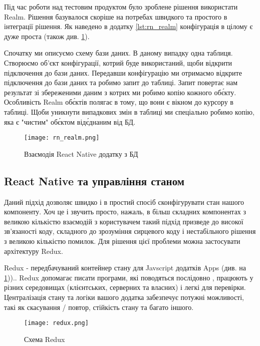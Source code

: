 Під час роботи над тестовим продуктом було зроблене рішення використати Realm.
Рішення базувалося скоріше на потребах швидкого та простого в інтеграції рішення.
Як наведено в додатку \ref{lst:rn_realm}  конфігурація в цілому є дуже проста (також див. \ref{fig:rn_realm}).

Спочатку ми описуємо схему бази даних. В даному випадку одна таблиця.
Створюємо об'єкт конфігурації, котрий буде використаний, щоби відкрити підключення до бази даних.
Передавши конфігурацію ми отримаємо відкрите підключення до бази даних та робимо запит до таблиці.
Запит повертає нам результат зі збереженими даним з котрих ми робимо копію кожного об\'єкту.
Особливість Realm об\'єктів полягає в тому, що вони є вікном до курсору в таблиці.
Щоби уникнути випадкових змін в таблиці ми спеціально робимо копію, яка є "чистим" об\'єктом від\'єднаним від БД.

\begin{figure}
    \begin{center}
        \texttt{[image: rn\_realm.png]}
    \end{center}
    \caption{Взаємодія React Native додатку з БД}
    \label{fig:rn_realm}
\end{figure}

\subsection{React Native та управління станом}
\label{subsec:rn_state_management}

Даний підхід дозволяє швидко і в простий спосіб сконфігурувати стан нашого компоненту.
Хоч це і звучить просто, нажаль, в більш складних компонентах з великою кількістю взаємодій
з користувачем такий підхід призведе до високої зв'язаності коду,
складного до зрозуміння сирцевого коду і нестабільного рішення з великою кількістю помилок.
Для рішення цієї проблеми можна застосувати архітектуру Redux.

Redux - передбачуваний контейнер стану для Javscript додатків Apps (див. на \ref{fig:rn_realm}))..
Redux допомагає писати програми, які поводяться послідовно , працюють у різних середовищах
(клієнтських, серверних та власних) і легкі для перевірки. \cite{redux_home_page}
Централізація стану та логіки вашого додатка забезпечує потужні можливості, такі як скасування / повтор,
стійкість стану та багато іншого. \cite{redux_home_page}

\begin{center}
    \begin{figure}
        \texttt{[image: redux.png]}
        \caption{Схема Redux}
        \label{fig:rn_redux}
    \end{figure}
\end{center}


